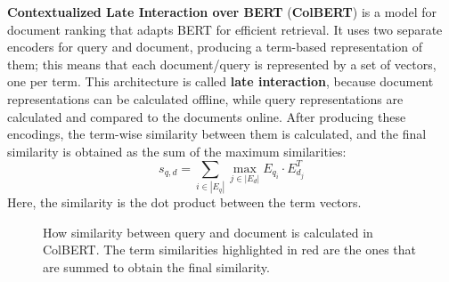 \textbf{ Contextualized Late Interaction over BERT} (\textbf{ColBERT}) is a model for document ranking that adapts BERT for efficient retrieval. It uses two separate encoders for query and document, producing a term-based representation of them; this means that each document/query is represented by a set of vectors, one per term. This architecture is called \textbf{late interaction}, because document representations can be calculated offline, while query representations are calculated and compared to the documents online. After producing these encodings, the term-wise similarity between them is calculated, and the final similarity is obtained as the sum of the maximum similarities:
\begin{equation*}
    s_{q,d} = \sum_{i \in |E_q|} \max_{j \in |E_d|} E_{q_i} \cdot E_{d_j}^T
\end{equation*}
Here, the similarity is the dot product between the term vectors.
\begin{figure}[h]
    \vspace{15pt}
    \centering
    
    \caption{How similarity between query and document is calculated in ColBERT. The term similarities highlighted in red are the ones that are summed to obtain the final similarity.}
\end{figure}
